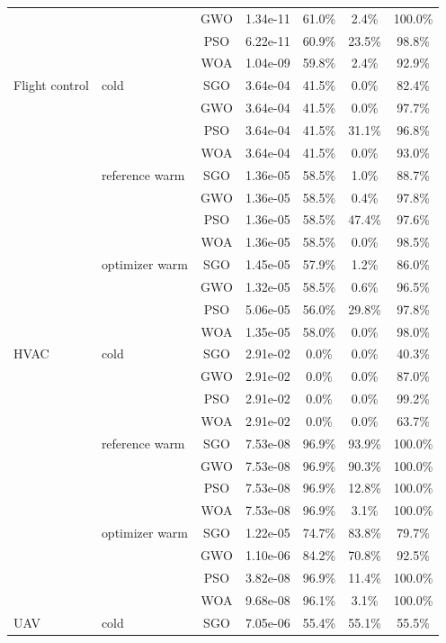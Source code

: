 \begin{table}[htbp]
{\begin{tabular}{@{}llccccc@{}}
 &  & GWO & 1.34e-11 & 61.0\% & 2.4\% & 100.0\% \\
 &  & PSO & 6.22e-11 & 60.9\% & 23.5\% & 98.8\% \\
 &  & WOA & 1.04e-09 & 59.8\% & 2.4\% & 92.9\% \\
\addlinespace
Flight control & cold & SGO & 3.64e-04 & 41.5\% & 0.0\% & 82.4\% \\
 &  & GWO & 3.64e-04 & 41.5\% & 0.0\% & 97.7\% \\
 &  & PSO & 3.64e-04 & 41.5\% & 31.1\% & 96.8\% \\
 &  & WOA & 3.64e-04 & 41.5\% & 0.0\% & 93.0\% \\
 & reference warm & SGO & 1.36e-05 & 58.5\% & 1.0\% & 88.7\% \\
 &  & GWO & 1.36e-05 & 58.5\% & 0.4\% & 97.8\% \\
 &  & PSO & 1.36e-05 & 58.5\% & 47.4\% & 97.6\% \\
 &  & WOA & 1.36e-05 & 58.5\% & 0.0\% & 98.5\% \\
 & optimizer warm & SGO & 1.45e-05 & 57.9\% & 1.2\% & 86.0\% \\
 &  & GWO & 1.32e-05 & 58.5\% & 0.6\% & 96.5\% \\
 &  & PSO & 5.06e-05 & 56.0\% & 29.8\% & 97.8\% \\
 &  & WOA & 1.35e-05 & 58.0\% & 0.0\% & 98.0\% \\
\addlinespace
HVAC & cold & SGO & 2.91e-02 & 0.0\% & 0.0\% & 40.3\% \\
 &  & GWO & 2.91e-02 & 0.0\% & 0.0\% & 87.0\% \\
 &  & PSO & 2.91e-02 & 0.0\% & 0.0\% & 99.2\% \\
 &  & WOA & 2.91e-02 & 0.0\% & 0.0\% & 63.7\% \\
 & reference warm & SGO & 7.53e-08 & 96.9\% & 93.9\% & 100.0\% \\
 &  & GWO & 7.53e-08 & 96.9\% & 90.3\% & 100.0\% \\
 &  & PSO & 7.53e-08 & 96.9\% & 12.8\% & 100.0\% \\
 &  & WOA & 7.53e-08 & 96.9\% & 3.1\% & 100.0\% \\
 & optimizer warm & SGO & 1.22e-05 & 74.7\% & 83.8\% & 79.7\% \\
 &  & GWO & 1.10e-06 & 84.2\% & 70.8\% & 92.5\% \\
 &  & PSO & 3.82e-08 & 96.9\% & 11.4\% & 100.0\% \\
 &  & WOA & 9.68e-08 & 96.1\% & 3.1\% & 100.0\% \\
\addlinespace
UAV & cold & SGO & 7.05e-06 & 55.4\% & 55.1\% & 55.5\% \\

\end{tabular}}
\end{table}
